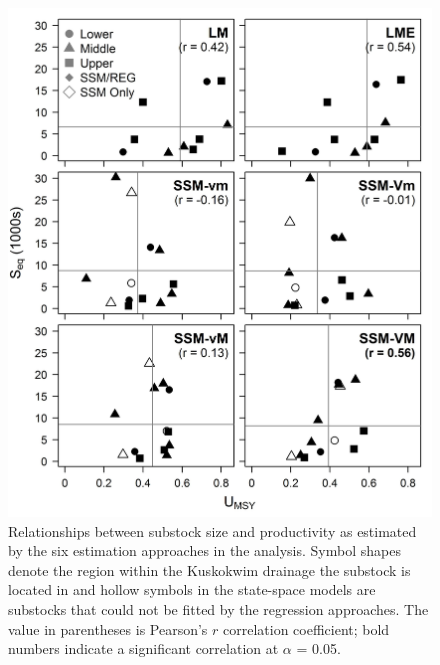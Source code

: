 \documentclass[12pt,]{book}
\theoremstyle{definition}
\theoremstyle{definition}
\theoremstyle{definition}
\theoremstyle{remark}
\begin{document}
\begin{figure}
  \centering
  \includegraphics{img/Ch4/Size-v-Prod.jpg}
  \caption{Relationships between substock size and productivity as estimated by the six estimation approaches in the analysis. Symbol shapes denote the region within the Kuskokwim drainage the substock is located in and hollow symbols in the state-space models are substocks that could not be fitted by the regression approaches. The value in parentheses is Pearson's $r$ correlation coefficient; bold numbers indicate a significant correlation at $\alpha$ = 0.05.}
  \label{fig:size-v-prod}
\end{figure}

\clearpage
\end{document}
